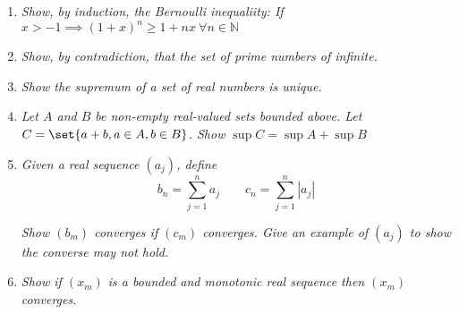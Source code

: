 \documentclass{article}
\begin{document}
\displayoptions

\section{}

\begin{enumerate}[1.]
  \item \textit{Show, by induction, the Bernoulli inequaliity: If $x > -1 \implies (1 + x)^n \ge 1 + nx ~ \forall n \in \mathbb{N}$}

  \item \textit{Show, by contradiction, that the set of prime numbers of infinite.}

  \item \textit{Show the supremum of a set of real numbers is unique.}

  \item \textit{Let $A$ and $B$ be non-empty real-valued sets bounded above. Let $C = \set{a +b, a \in A, b \in B}$. Show $\sup C = \sup A + \sup B$}

  \item \textit{Given a real sequence $(a_j)$, define}
    \[
        b_n = \sum^{n}_{j = 1} a_j
        \quad\quad
        c_n = \sum^{n}_{j = 1} |a_j|
    \]

    \textit{Show $(b_m)$ converges if $(c_m)$ converges. Give an example of $(a_j)$ to show the converse may not hold.}

  \item \textit{Show if $(x_m)$ is a bounded and monotonic real sequence then $(x_m)$ converges.}
\end{enumerate}

\end{document}

